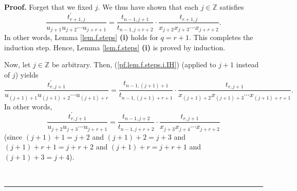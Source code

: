 \documentclass[numbers=enddot,12pt,final,onecolumn,notitlepage]{scrartcl}%
\theoremstyle{definition}
\newenvironment{proof}[1][Proof]{\noindent\textbf{#1.} }{\ \rule{0.5em}{0.5em}}
\newenvironment{verlong}{}{}
\newenvironment{vershort}{}{}
\begin{document}
\begin{proof}
\begin{vershort}
Forget that we fixed $j$. We thus have shown that each $j\in\mathbb{Z}$
satisfies%
\[
\dfrac{t_{r+1,j}^{\prime}}{u_{j+1}u_{j+2}\cdots u_{j+r+1}}=\dfrac{t_{n-1,j+1}%
}{t_{n-1,j+r+2}}\cdot\dfrac{t_{r+1,j}}{x_{j+2}x_{j+3}\cdots x_{j+r+2}}.
\]
In other words, Lemma \ref{lem.f.steps} \textbf{(i)} holds for $q=r+1$. This
completes the induction step. Hence, Lemma \ref{lem.f.steps} \textbf{(i)} is
proved by induction.
\end{vershort}

\begin{verlong}
Now, let $j\in\mathbb{Z}$ be arbitrary. Then, (\ref{pf.lem.f.steps.i.IH})
(applied to $j+1$ instead of $j$) yields%
\[
\dfrac{t_{r,j+1}^{\prime}}{u_{\left(  j+1\right)  +1}u_{\left(  j+1\right)
+2}\cdots u_{\left(  j+1\right)  +r}}=\dfrac{t_{n-1,\left(  j+1\right)  +1}%
}{t_{n-1,\left(  j+1\right)  +r+1}}\cdot\dfrac{t_{r,j+1}}{x_{\left(
j+1\right)  +2}x_{\left(  j+1\right)  +3}\cdots x_{\left(  j+1\right)  +r+1}%
}.
\]
In other words,%
\begin{equation}
\dfrac{t_{r,j+1}^{\prime}}{u_{j+2}u_{j+3}\cdots u_{j+r+1}}=\dfrac{t_{n-1,j+2}%
}{t_{n-1,j+r+2}}\cdot\dfrac{t_{r,j+1}}{x_{j+3}x_{j+4}\cdots x_{j+r+2}}
\label{pf.lem.f.steps.i.IH3}%
\end{equation}
(since $\left(  j+1\right)  +1=j+2$ and $\left(  j+1\right)  +2=j+3$ and
$\left(  j+1\right)  +r+1=j+r+2$ and $\left(  j+1\right)  +r=j+r+1$ and
$\left(  j+1\right)  +3=j+4$).


\end{verlong}
\end{proof}
\end{document}
